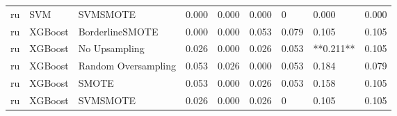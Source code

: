 \begin{tabular}{lllllllll}
      ru &                          SVM &            SVMSMOTE & 0.000 &                     0.000 &                 0.000 &                      0 &                                   0.000 &     0.000 \\
      ru &                      XGBoost &     BorderlineSMOTE & 0.000 &                     0.000 &                 0.053 &                  0.079 &                                   0.105 &     0.105 \\
      ru &                      XGBoost &       No Upsampling & 0.026 &                     0.000 &                 0.026 &                  0.053 &                               **0.211** &     0.105 \\
      ru &                      XGBoost & Random Oversampling & 0.053 &                     0.026 &                 0.000 &                  0.053 &                                   0.184 &     0.079 \\
      ru &                      XGBoost &               SMOTE & 0.053 &                     0.000 &                 0.026 &                  0.053 &                                   0.158 &     0.105 \\
      ru &                      XGBoost &            SVMSMOTE & 0.026 &                     0.000 &                 0.026 &                      0 &                                   0.105 &     0.105 \\
\bottomrule
\end{tabular}
